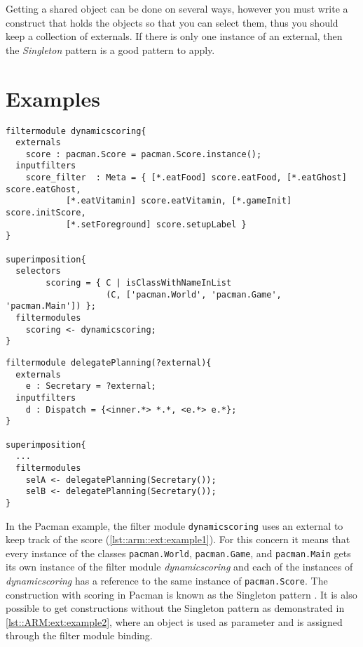 Getting a shared object can be done on several ways, however you must write a construct that holds the objects so that you can select them, thus you should keep a collection of externals. 
If there is only one instance of an external, then the \emph{Singleton} pattern is a good pattern to apply.

\section{Examples}
\begin{lstlisting}[caption = {Dynamic scoring filter module from the Pacman example}, label = lst::arm::ext:example1,
style = listing, language = ComposeStar, float=tpb]
filtermodule dynamicscoring{
  externals
    score : pacman.Score = pacman.Score.instance();
  inputfilters 
    score_filter  : Meta = { [*.eatFood] score.eatFood, [*.eatGhost] score.eatGhost, 
			[*.eatVitamin] score.eatVitamin, [*.gameInit] score.initScore,
			[*.setForeground] score.setupLabel }
}

superimposition{
  selectors
		scoring = { C | isClassWithNameInList
		            (C, ['pacman.World', 'pacman.Game', 'pacman.Main']) };
  filtermodules
    scoring <- dynamicscoring;
}
\end{lstlisting}
\begin{lstlisting}[caption = {An external without the singleton construction}, label = lst::ARM:ext:example2,
style = listing, language = ComposeStar, float = tpb]
filtermodule delegatePlanning(?external){
  externals
    e : Secretary = ?external;
  inputfilters
    d : Dispatch = {<inner.*> *.*, <e.*> e.*};
}

superimposition{
  ...
  filtermodules
    selA <- delegatePlanning(Secretary());
    selB <- delegatePlanning(Secretary());
}
\end{lstlisting}
In the Pacman example, the filter module \lstinline!dynamicscoring! uses an external to keep track of the score (\autoref{lst::arm::ext:example1}). 
For this concern it means that every instance of the classes \lstinline!pacman.World!, \lstinline!pacman.Game!,
and \lstinline!pacman.Main! gets its own instance of the filter module \emph{dynamicscoring} and each of the instances of \emph{dynamicscoring} has a reference to the same instance of \lstinline!pacman.Score!. 
The construction with scoring in Pacman is known as the Singleton pattern \cite{Gamma95}. 
It is also possible to get constructions without the Singleton pattern as demonstrated in \autoref{lst::ARM:ext:example2}, where an object is used as parameter and is assigned through the filter module binding.

